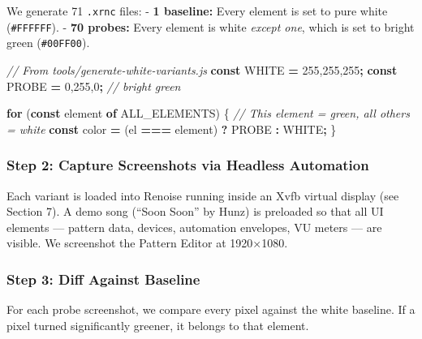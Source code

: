 \documentclass[
  11pt,
  oneside]{report}
\newenvironment{Shaded}{\begin{snugshade}}{\end{snugshade}}
\newcommand{\CommentTok}[1]{\textcolor[rgb]{0.56,0.35,0.01}{\textit{#1}}}
\newcommand{\ControlFlowTok}[1]{\textcolor[rgb]{0.13,0.29,0.53}{\textbf{#1}}}
\newcommand{\KeywordTok}[1]{\textcolor[rgb]{0.13,0.29,0.53}{\textbf{#1}}}
\newcommand{\NormalTok}[1]{#1}
\newcommand{\OperatorTok}[1]{\textcolor[rgb]{0.81,0.36,0.00}{\textbf{#1}}}
\newcommand{\StringTok}[1]{\textcolor[rgb]{0.31,0.60,0.02}{#1}}
\begin{document}
We generate 71 \texttt{.xrnc} files: - \textbf{1 baseline:} Every
element is set to pure white (\texttt{\#FFFFFF}). - \textbf{70 probes:}
Every element is white \emph{except one}, which is set to bright green
(\texttt{\#00FF00}).

\begin{Shaded}
\begin{Highlighting}[]
\CommentTok{// From tools/generate{-}white{-}variants.js}
\KeywordTok{const}\NormalTok{ WHITE }\OperatorTok{=} \StringTok{\textquotesingle{}255,255,255\textquotesingle{}}\OperatorTok{;}
\KeywordTok{const}\NormalTok{ PROBE }\OperatorTok{=} \StringTok{\textquotesingle{}0,255,0\textquotesingle{}}\OperatorTok{;} \CommentTok{// bright green}

\ControlFlowTok{for}\NormalTok{ (}\KeywordTok{const}\NormalTok{ element }\KeywordTok{of}\NormalTok{ ALL\_ELEMENTS) \{}
  \CommentTok{// This element = green, all others = white}
  \KeywordTok{const}\NormalTok{ color }\OperatorTok{=}\NormalTok{ (el }\OperatorTok{===}\NormalTok{ element) }\OperatorTok{?}\NormalTok{ PROBE }\OperatorTok{:}\NormalTok{ WHITE}\OperatorTok{;}
\NormalTok{\}}
\end{Highlighting}
\end{Shaded}

\subsubsection{Step 2: Capture Screenshots via Headless
Automation}\label{step-2-capture-screenshots-via-headless-automation}

Each variant is loaded into Renoise running inside an Xvfb virtual
display (see Section 7). A demo song (``Soon Soon'' by Hunz) is
preloaded so that all UI elements --- pattern data, devices, automation
envelopes, VU meters --- are visible. We screenshot the Pattern Editor
at 1920×1080.

\subsubsection{Step 3: Diff Against
Baseline}\label{step-3-diff-against-baseline}

For each probe screenshot, we compare every pixel against the white
baseline. If a pixel turned significantly greener, it belongs to that
element.
\end{document}
